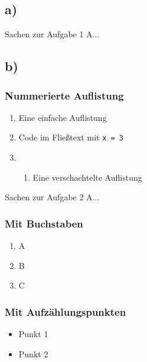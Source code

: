 \rhead{}


\subsection*{a)}
Sachen zur Aufgabe 1 A...

\subsection*{b)}
\subsubsection*{Nummerierte Auflistung}
\begin{enumerate}
	\item Eine einfache Auflistung
	\item Code im Fließtext mit \texttt{x = 3}
	\item \begin{enumerate}
		      \item Eine verschachtelte Auflistung
	      \end{enumerate}
\end{enumerate}

\newpage


Sachen zur Aufgabe 2 A...

\subsubsection*{Mit Buchstaben}
\begin{enumerate}
	\item A
	\item B
	\item C
\end{enumerate}

\subsubsection*{Mit Aufzählungspunkten}
\begin{itemize}
	\item Punkt 1
	\item Punkt 2
\end{itemize}
